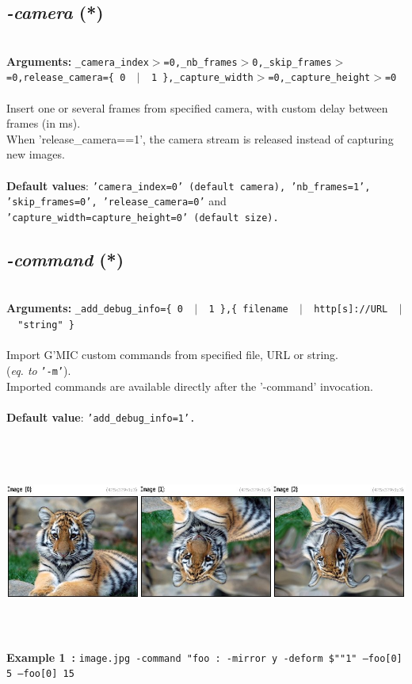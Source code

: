 \documentclass[a4paper,11pt,twoside]{book}
\begin{document}
\subsection{\emph{-camera} (*)}\vspace*{-0.5em}
~\\\textbf{Arguments: } 
{\small \texttt{\_camera\_index$>$=0,\_nb\_frames$>$0,\_skip\_frames$>$=0,release\_camera=\{ 0 ~$|$~ 1 \},\_capture\_width$>$=0,\_capture\_height$>$=0}}\\~\\
Insert one or several frames from specified camera, with custom delay between frames (in ms).
~\\When 'release\_camera==1', the camera stream is released instead of capturing new images.
~\\~\\\textbf{Default values}: {\small \texttt{'camera\_index=0' (default camera), 'nb\_frames=1', 'skip\_frames=0', 'release\_camera=0'} and \texttt{'capture\_width=capture\_height=0' (default size).}}


\subsection{\emph{-command} (*)}\vspace*{-0.5em}
~\\\textbf{Arguments: } 
{\small \texttt{\_add\_debug\_info=\{ 0 ~$|$~ 1 \},\{ filename ~$|$~ http[s]://URL ~$|$~ "string" \}}}\\~\\
Import G'MIC custom commands from specified file, URL or string.
~\\(\emph{eq. to} {\small \texttt{'-m'}}).
~\\Imported commands are available directly after the '-command' invocation.
~\\~\\\textbf{Default value}: {\small \texttt{'add\_debug\_info=1'.}}
\begin{center}\includegraphics[keepaspectratio=true,height=7cm,width=\textwidth]{img/gmic_def1.jpg}\\
{\footnotesize \textbf{Example 1~:} \texttt{image.jpg -command "foo : -mirror y -deform \$""1" --foo[0] 5 --foo[0] 15}}
\end{center}
\end{document}
